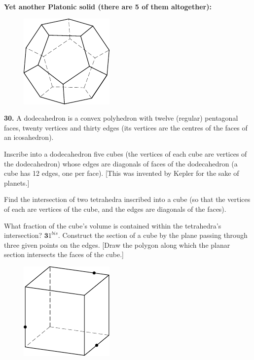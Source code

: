 \documentclass[12pt]{article}  %
\begin{document}
\newpage
\noindent
{\bf Yet another Platonic solid (there are 5 of them altogether):}
\begin{figure}[h]
\centering
\includegraphics{taskbook-14}\\[2pt]
\end{figure}

\noindent
{\bf 30.} A dodecahedron is a convex polyhedron with twelve (regular) pentagonal
faces, twenty vertices
and thirty edges (its vertices are the centres of the faces of an icosahedron).

Inscribe into a dodecahedron five cubes (the vertices of each cube are vertices of the dodecahedron)
whose edges are diagonals of faces of the dodecahedron (a cube has 12 edges, one per face).
[This was invented by Kepler for the sake of planets.] 

\bigskip
{} Find the intersection of two tetrahedra inscribed into a cube (so that the vertices of each are
vertices of the cube, and the edges are diagonals of the faces). 

What fraction of the cube's volume is contained within the tetrahedra's intersection?
\newline\newline\quad
$\mathbf 31^{bis}.$ Construct the section of a cube by the plane passing through three given points on the edges.
[Draw the polygon along which the planar section intersects the faces of the cube.]
\begin{figure}[h]
\centering
 \includegraphics{taskbook-15}
\end{figure}
\end{document}
